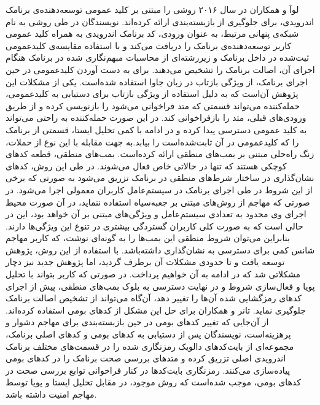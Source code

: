 لوآ و همکاران در سال ۲۰۱۶ روشی را مبتنی بر کلید عمومی توسعه‌دهنده‌ی برنامک اندرویدی، برای جلوگیری از بازبسته‌بندی ارائه کرده‌اند. نویسندگان در طی روشی به نام شبکه‌ی پنهانی مرتبط‌، به عنوان ورودی، کد برنامک اندرویدی به همراه کلید عمومی کاربر توسعه‌دهنده‌ی برنامک را دریافت می‌کند و با استفاده  مقایسه‌ی کلید‌عمومی ثیت‌‌شده در داخل برنامک و زیررشته‌ای از محاسبات مبهم‌نگاری شده در برنامک هنگام اجرای آن، اصالت برنامک را تشخیص می‌دهند. برای به ‌دست آوردن کلید‌عمومی در حین اجرای برنامک، از ویژگی بازتاب در زبان جاوا استفاده شده‌است. یکی از مشکلات این پژوهش آن‌است که به دلیل استفاده از ویژگی بازتاب برای دستیابی به کلید‌عمومی، حمله‌کننده می‌تواند قسمتی که متد فراخوانی می‌شود را بازنویسی کرده و از طریق ورودی‌های قبلی، متد را بازفراخوانی کند. در این صورت حمله‌کننده به راحتی می‌تواند به کلید عمومی دسترسی پیدا کرده و در ادامه با کمی تحلیل ایستا، قسمتی از برنامک را که کلید‌عمومی در آن ‌ثابت‌شده‌است را بیابد.به جهت مقابله با این نوع از حملات، زنگ  راه‌حلی مبتنی بر بمب‌های منطقی‌ ارا‌ئه کرده‌است. بمب‌های منطقی، قطعه‌ کد‌های کوچکی هستند که تنها در حالاتی خاص فعال می‌شوند. در طی این روش، کد‌های نشان‌گذاری در ساختار شرط‌های منطقی در برنامک تزریق می‌شود به صورتی که برخی از این شروط‌ در طی اجرای برنامک در سیستم‌عامل کاربران معمولی اجرا می‌شود. در صورتی که مهاجم از روش‌های مبتنی بر جعبه‌سیاه استفاده ننماید، در آن صورت محیط اجرای وی محدود به تعدادی سیستم‌عامل و ویژگی‌های مبتنی بر آن خواهد بود، این در حالی است که به صورت کلی کاربران گستردگی بیشتری در تنوع این ویژگی‌ها دارند. بنابراین می‌توان شروط منطقی این بمب‌ها را به گونه‌ای نوشت، که کاربر مهاجم شانس کمی برای دسترسی به نشان‌گذاری داشته‌باشد. با استفاده از این روش، پژوهش  توسعه یافت و تا حدودی مشکلات آن برطرف گردید، اما پژوهش جدید نیز دچار مشکلاتی شد که در ادامه به آن خواهیم پرداخت. در صورتی که کاربر بتواند با تحلیل پویا و فعال‌سازی شروط و در نهایت دسترسی به بلوک بمب‌های منطقی، پیش از اجرای کد‌های رمزگشایی شده آن‌ها را تغییر دهد، آن‌گاه می‌تواند از تشخیص اصالت برنامک جلوگیری نماید. تانر و همکاران برای حل این مشکل از کد‌های بومی استفاده کرده‌اند. از آن‌جایی که تغییر کد‌های بومی در حین بازبسته‌بندی برای مهاجم دشوار و پرهزینه‌است، نویسندگان پس از دستیابی به کد‌های بومی و کد‌های اصلی برنامک، مجموعه‌ای از بایت‌کد‌های دالویک رمز‌نگاری شده را در قسمت‌های مختلف برنامک اندرویدی اصلی تزریق کرده و متد‌های بررسی صحت برنامک را در کد‌های بومی پیاده‌سازی می‌کنند. رمز‌نگاری بایت‌کد‌ها در کنار فراخوانی توابع بررسی صحت در کدهای بومی، موجب شده‌است که روش موجود، در مقابل تحلیل ایستا و پویا توسط مهاجم امنیت داشته باشد.
